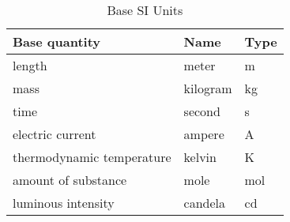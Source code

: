 \pos{\footnotesize}{\HHHH}
\begin{table}[h]\HHHH
  \centering
\begin{tabular}{|lll|} \hline
Base quantity     &          Name   &      Type \\ \hline
length            &          meter   &     m \\
mass              &          kilogram   &  kg \\
time              &          second  &     s \\
electric current     &       ampere   &    A \\
thermodynamic temperature &  kelvin  &     K \\
amount of substance    &     mole    &     mol \\
luminous intensity     &     candela &     cd \\ \hline
\end{tabular} \caption{\HHHH Base SI Units} \label{table:1}
\end{table}
\normalsize\HHHH
\mnewfoil
\noindent
{}
\pos{\footnotesize}{\HHHH\LLLL}%
